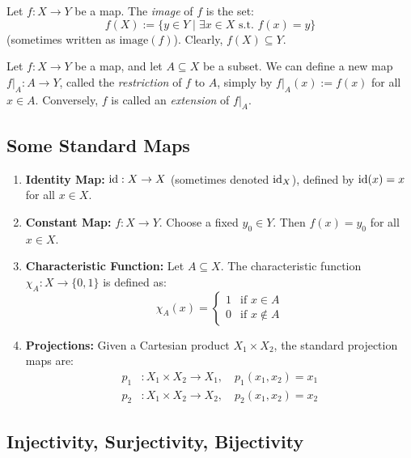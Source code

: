 \begin{definition}Let $f: X \to Y$ be a map. The \textit{image} of $f$ is the set:
\[
f(X) := \{y \in Y \mid \exists x \in X \text{ s.t. } f(x) = y\}
\]
(sometimes written as $\text{image}(f)$). Clearly, $f(X) \subseteq Y$.
\end{definition}

\begin{definition}
Let $f: X \to Y$ be a map, and let $A \subseteq X$ be a subset. We can define a new map $f|_A: A \to Y$, called the \textit{restriction} of $f$ to $A$, simply by $f|_A(x) := f(x)$ for all $x \in A$.
Conversely, $f$ is called an \textit{extension} of $f|_A$.
\end{definition}

\subsection{Some Standard Maps}

\begin{example}
\begin{enumerate}
    \item \textbf{Identity Map:} $\operatorname{id}: X \to X$ (sometimes denoted $\operatorname{id}_X$), defined by $\operatorname{id}(x) = x$ for all $x \in X$.
    \item \textbf{Constant Map:} $f: X \to Y$. Choose a fixed $y_0 \in Y$. Then $f(x) = y_0$ for all $x \in X$.
    \item \textbf{Characteristic Function:} Let $A \subseteq X$. The characteristic function $\chi_A: X \to \{0, 1\}$ is defined as:
    \[
    \chi_A(x) = 
    \begin{cases}
    1 & \text{if } x \in A \\
    0 & \text{if } x \notin A
    \end{cases}
    \]
    \item \textbf{Projections:} Given a Cartesian product $X_1 \times X_2$, the standard projection maps are:
    \begin{align*}
    p_1&: X_1 \times X_2 \to X_1, \quad p_1(x_1, x_2) = x_1 \\
    p_2&: X_1 \times X_2 \to X_2, \quad p_2(x_1, x_2) = x_2
    \end{align*}
\end{enumerate}
\end{example}

\subsection{Injectivity, Surjectivity, Bijectivity}

